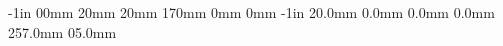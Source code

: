 
\usepackage[utf8]{inputenc}
\usepackage[italian]{babel}
\usepackage{xspace}
\usepackage{epsfig,amsmath,amsthm,amsfonts,graphicx,amssymb}
\usepackage{times}

\usepackage{lipsum}

\setlength{\hoffset}         { -1in}  %
\addtolength{\hoffset}       { 00mm}  %
\setlength{\oddsidemargin}   { 20mm}  %
\setlength{\evensidemargin}  { 20mm}  %
\setlength{\textwidth}       {170mm}  %
\setlength{\marginparsep}    {  0mm}  %
\setlength{\marginparwidth}  {  0mm}  %
\setlength{\voffset}       {   -1in}  %
\addtolength{\voffset}     { 20.0mm}  %
\setlength{\topmargin}     {  0.0mm}  %
\setlength{\headheight}    {  0.0mm}  %
\setlength{\headsep}       {  0.0mm}  %
\setlength{\textheight}    {257.0mm}  %
\setlength{\footskip}      { 05.0mm}  %


\usepackage{ifthen}



\newcommand{\tesiUniversita}{\empty}
\newcommand{\tesiDipartimento}{\empty}
\newcommand{\tesiCdL}{\empty}

\newcommand{\tesiCandidato}{\empty}
\newcommand{\tesiMatricola}{\empty}
\newcommand{\tesiTitolo}{\empty}
\newcommand{\tesiAA}{\empty}
\newcommand{\tesiData}{\empty}

\newcommand{\tesiRelatoreA}{\empty}

